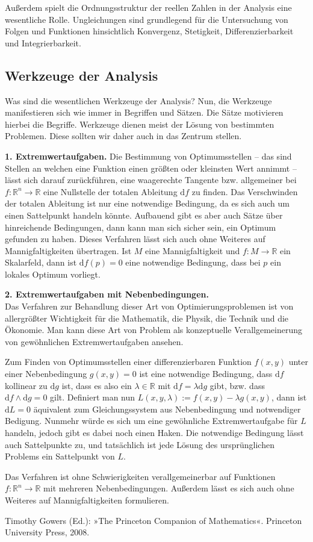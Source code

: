 \documentclass[a4paper,10pt,fleqn,twocolumn,twoside]{scrartcl}
\newcommand{\R}{\mathbb R}
\newcommand{\strong}[1]{\textsf{\textbf{#1}}}
\begin{document}
Außerdem spielt die Ordnungsstruktur der reellen Zahlen in der
Analysis eine wesentliche Rolle. Ungleichungen sind grundlegend
für die Untersuchung von Folgen und Funktionen hinsichtlich
Konvergenz, Stetigkeit, Differenzierbarkeit und Integrierbarkeit.

\subsection{Werkzeuge der Analysis}

Was sind die wesentlichen Werkzeuge der Analysis? Nun, die Werkzeuge
manifestieren sich wie immer in Begriffen und Sätzen. Die Sätze
motivieren hierbei die Begriffe. Werkzeuge dienen meist der Lösung
von bestimmten Problemen. Diese sollten wir daher auch in das Zentrum
stellen.

\strong{1. Extremwertaufgaben.} Die Bestimmung von Optimumsstellen
-- das sind Stellen an welchen eine Funktion einen größten oder
kleinsten Wert annimmt -- lässt sich darauf zurückführen, eine
waagerechte Tangente bzw. allgemeiner bei $f\colon\R^n\to\R$ eine
Nullstelle der totalen Ableitung $\mathrm df$ zu finden. Das
Verschwinden der totalen Ableitung ist nur eine notwendige Bedingung,
da es sich auch um einen Sattelpunkt handeln könnte. Aufbauend
gibt es aber auch Sätze über hinreichende Bedingungen, dann kann man
sich sicher sein, ein Optimum gefunden zu haben. Dieses Verfahren
lässt sich auch ohne Weiteres auf Mannigfaltigkeiten übertragen.
Ist $M$ eine Mannigfaltigkeit und $f\colon M\to\R$ ein Skalarfeld,
dann ist $\mathrm df(p)=0$ eine notwendige Bedingung, dass bei $p$
ein lokales Optimum vorliegt.

\strong{2. Extremwertaufgaben mit Nebenbedingungen.}\\
Das Verfahren zur Behandlung dieser Art von Optimierungsproblemen
ist von allergrößter Wichtigkeit für die Mathematik, die Physik,
die Technik und die Ökonomie. Man kann diese Art von Problem als
konzeptuelle Verallgemeinerung von gewöhnlichen Extremwertaufgaben
ansehen.

Zum Finden von Optimumsstellen einer differenzierbaren Funktion
$f(x,y)$ unter einer Nebenbedingung $g(x,y)=0$ ist eine notwendige
Bedingung, dass $\mathrm df$ kollinear zu $\mathrm dg$ ist, dass
es also ein $\lambda\in\R$ mit $\mathrm df = \lambda\mathrm dg$
gibt, bzw. dass $\mathrm df\wedge\mathrm dg=0$ gilt. Definiert
man nun $L(x,y,\lambda):=f(x,y)-\lambda g(x,y)$, dann ist
$\mathrm dL=0$ äquivalent zum Gleichungssystem aus Nebenbedingung
und notwendiger Bedigung. Nunmehr würde es sich um eine
gewöhnliche Extremwertaufgabe für $L$ handeln, jedoch gibt
es dabei noch einen Haken. Die notwendige Bedingung lässt auch
Sattelpunkte zu, und tatsächlich ist jede Lösung des ursprünglichen
Problems ein Sattelpunkt von $L$.

Das Verfahren ist ohne Schwierigkeiten verallgemeinerbar auf
Funktionen $f\colon\R^n\to\R$ mit mehreren Nebenbedingungen.
Außerdem lässt es sich auch ohne Weiteres auf Mannigfaltigkeiten
formulieren.

\begin{thebibliography}{0}
 Timothy Gowers (Ed.):
»The Princeton Companion of Mathematics«. Princeton University Press,
2008.
\end{thebibliography}
\end{document}
